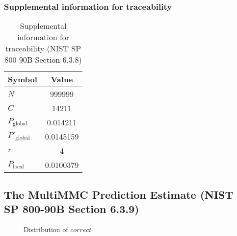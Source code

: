 \documentclass[a3paper,xelatex,english]{bxjsarticle}
\begin{document}
\subsubsection{Supplemental information for traceability}
\renewcommand{\arraystretch}{1.8}
\begin{table}[h]
\caption{Supplemental information for traceability (NIST SP 800-90B Section 6.3.8)}
\begin{center}
\begin{tabular}{|l|c|}
\hline 
\rowcolor{anotherlightblue} %
Symbol				& Value \\ \hline 
$N$				& 999999\\ \hline 
$C$				& 14211\\ \hline 
$P_{\textrm{global}}$				& 0.014211\\ \hline 
$P'_{\textrm{global}}$			& 0.0145159\\ \hline 
$r$				& 4\\ \hline 
$P_{\textrm{local}}$ 			& 0.0100379\\ \hline
\end{tabular}
\end{center}
\end{table}
\renewcommand{\arraystretch}{1.4}
\clearpage
\subsection{The MultiMMC Prediction Estimate (NIST SP 800-90B Section 6.3.9)}\label{sec:NonBinary639}

\begin{figure}[htbp]
\centering

\caption{Distribution of $correct$}
\end{figure}
\end{document}
